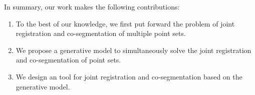 In summary, our work makes the following contributions: 
\begin{enumerate}
	\item To the best of our knowledge, we first put forward the problem of joint registration and co-segmentation of multiple point sets.
	
	\item We propose a generative model to simultaneously solve the joint registration and co-segmentation of point sets.
	
	\item We design an  tool for joint registration and co-segmentation based on the generative model. 
\end{enumerate}